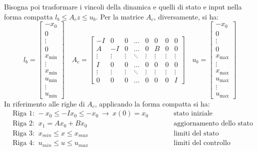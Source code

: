 Bisogna poi trasformare i vincoli della dinamica e quelli di stato e
input nella forma compatta $l_b \le A_c z \le u_b$. Per la matrice $A_c$, diversamente, si ha:
\[
l_b = \begin{bmatrix}
    -x_0 \\
    0 \\
    \vdots \\
    0 \\
    x_{\text{min}} \\
    \vdots \\
    x_{\text{min}} \\
    u_{\text{min}} \\
    \vdots \\
    u_{\text{min}}
\end{bmatrix}
\quad
A_c = \begin{bmatrix}
    -I & 0 & 0 & \dots & 0 & 0 & 0 & 0 \\
    A & -I & 0 & \dots & 0 & B & 0 & 0 \\
    \vdots & \vdots & \vdots & \ddots & \vdots & \vdots & \vdots & \vdots \\
    \hline
    I & 0 & 0 & \dots & 0 & 0 & 0 & 0 \\
    \vdots & \vdots & \vdots & \ddots & \vdots & \vdots & \vdots & \vdots \\
    0 & 0 & 0 & \dots & 0 & 0 & 0 & I
\end{bmatrix}
\quad
u_b = \begin{bmatrix}
    -x_0 \\
    0 \\
    \vdots \\
    0 \\
    x_{\text{max}} \\
    \vdots \\
    x_{\text{max}} \\
    u_{\text{max}} \\
    \vdots \\
    u_{\text{max}}
\end{bmatrix}
\]
In riferimento alle righe di $A_c$, applicando la forma compatta si ha:
\[
\begin{aligned}
&\text{Riga 1: } -x_0 \le -I x_0 \le -x_0 \ \rightarrow \ x(0) = x_0 & \quad\quad &
\text{stato iniziale} \\
&\text{Riga 2: } \ x_1 = A x_0 + B x_0 & \quad\quad & 
\text{aggiornamento dello stato} \\
&\text{Riga 3: } \ x_{min} \le x \le x_{max} & \quad\quad & 
\text{limiti del stato} \\
&\text{Riga 4: } \ u_{min} \le u \le u_{max} & \quad\quad & \text{limiti del controllo}
\end{aligned}
\]

